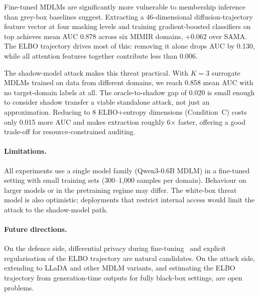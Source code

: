 Fine-tuned MDLMs are significantly more vulnerable to membership inference than
grey-box baselines suggest. Extracting a 46-dimensional diffusion-trajectory
feature vector at four masking levels and training gradient-boosted classifiers
on top achieves mean AUC 0.878 across six MIMIR domains, +0.062 over SAMA.
The ELBO trajectory drives most of this: removing it alone drops AUC by 0.130,
while all attention features together contribute less than 0.006.

The shadow-model attack makes this threat practical. With $K=3$ surrogate MDLMs
trained on data from different domains, we reach 0.858 mean AUC with no
target-domain labels at all. The oracle-to-shadow gap of 0.020 is small enough
to consider shadow transfer a viable standalone attack, not just an approximation.
Reducing to 8 ELBO+entropy dimensions (Condition~C) costs only 0.015 more AUC
and makes extraction roughly 6$\times$ faster, offering a good trade-off for
resource-constrained auditing.

\paragraph{Limitations.}
All experiments use a single model family (Qwen3-0.6B MDLM) in a fine-tuned setting
with small training sets (300--1,000 samples per domain). Behaviour on larger
models or in the pretraining regime may differ. The white-box threat model is
also optimistic; deployments that restrict internal access would limit the attack
to the shadow-model path.

\paragraph{Future directions.}
On the defence side, differential privacy during fine-tuning~\citep{abadi2016dp}
and explicit regularisation of the ELBO trajectory are natural candidates.
On the attack side, extending to LLaDA and other MDLM variants, and estimating
the ELBO trajectory from generation-time outputs for fully black-box settings,
are open problems.
